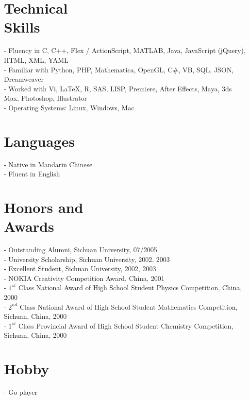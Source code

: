 \documentclass[margin,line]{resume}
\begin{document}
\begin{resume}
    \section{\mysidestyle Technical \\ Skills} 
      
      - Fluency in C, C++, Flex / ActionScript, MATLAB, Java, JavaScript (jQuery), HTML, XML, YAML \\
      - Familiar with Python, PHP, Mathematica, OpenGL, C\#, VB, SQL, JSON, Dreamweaver \\
      - Worked with Vi, \LaTeX, R, SAS, LISP, Premiere, After Effects, Maya, 3ds Max, Photoshop, Illustrator \\
      - Operating Systems: Linux, Windows, Mac       
      

    \section{\mysidestyle Languages}
      
      - Native in Mandarin Chinese \\
      - Fluent in English 
      

      
    \section{\mysidestyle Honors and \\ Awards} 
      
      - Outstanding Alumni, Sichuan University, 07/2005 \\
      - University Scholarship, Sichuan University, 2002, 2003 \\
      - Excellent Student, Sichuan University, 2002, 2003 \\
      - NOKIA Creativity Competition Award, China, 2001 \\
      - $1^{st}$ Class National Award of High School Student Physics Competition, China, 2000 \\
      - $2^{nd}$ Class National Award of High School Student Mathematics Competition, Sichuan, China, 2000 \\
      - $1^{st}$ Class Provincial Award of High School Student Chemistry Competition, Sichuan, China, 2000       
      

    \section{\mysidestyle Hobby} 
      
	- Go player
      

\end{resume}
\end{document}

